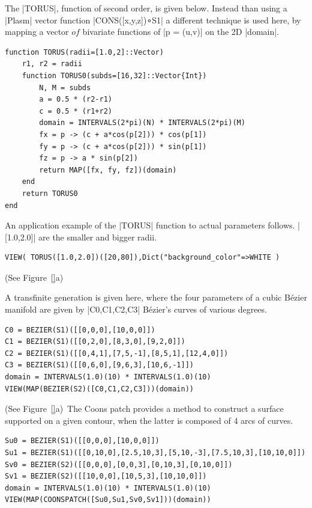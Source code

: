 \begin{coding}[Algebraic computation of FE = $\delta_1$]
\begin{condition}
The |TORUS|, function of second order, is given below.
Instead than using a |Plasm| vector function |CONS([x,y,z])∘S1| a different technique is used here, by mapping a vector $of$ bivariate functions of |p = (u,v)| on the 2D |domain|.
\begin{lstlisting}[language=JuliaLocal, style=julia, mathescape=true]
function TORUS(radii=[1.0,2]::Vector)
	r1, r2 = radii
	function TORUS0(subds=[16,32]::Vector{Int})
		N, M = subds
		a = 0.5 * (r2-r1)
		c = 0.5 * (r1+r2)
		domain = INTERVALS(2*pi)(N) * INTERVALS(2*pi)(M)
		fx = p -> (c + a*cos(p[2])) * cos(p[1])
		fy = p -> (c + a*cos(p[2])) * sin(p[1])
		fz = p -> a * sin(p[2])
		return MAP([fx, fy, fz])(domain)
	end
	return TORUS0
end
\end{lstlisting}
An application example of the |TORUS| function to actual parameters follows. 
|[1.0,2.0]| are the smaller and bigger radii.
\begin{lstlisting}[language=JuliaLocal, style=julia, mathescape=true]
VIEW( TORUS([1.0,2.0])([20,80]),Dict("background_color"=>WHITE ) 
\end{lstlisting}
\end{condition}

\begin{condition} (See Figure~\ref{}a)\ 

A transfinite generation is given here, where the four parameters of a cubic Bézier manifold are given by |C0,C1,C2,C3| Bézier’s curves of various degrees.
\begin{lstlisting}[language=JuliaLocal, style=julia, mathescape=true]
C0 = BEZIER(S1)([[0,0,0],[10,0,0]])
C1 = BEZIER(S1)([[0,2,0],[8,3,0],[9,2,0]])
C2 = BEZIER(S1)([[0,4,1],[7,5,-1],[8,5,1],[12,4,0]])
C3 = BEZIER(S1)([[0,6,0],[9,6,3],[10,6,-1]])
domain = INTERVALS(1.0)(10) * INTERVALS(1.0)(10)
VIEW(MAP(BEZIER(S2)([C0,C1,C2,C3]))(domain))
\end{lstlisting}
\end{condition}


\begin{condition} (See Figure~\ref{}a)\
The Coons patch provides a method to construct a surface supported on a given contour, when the latter is composed of 4 arcs of curves.
\begin{lstlisting}[language=JuliaLocal, style=julia, mathescape=true]
Su0 = BEZIER(S1)([[0,0,0],[10,0,0]])
Su1 = BEZIER(S1)([[0,10,0],[2.5,10,3],[5,10,-3],[7.5,10,3],[10,10,0]])
Sv0 = BEZIER(S2)([[0,0,0],[0,0,3],[0,10,3],[0,10,0]])
Sv1 = BEZIER(S2)([[10,0,0],[10,5,3],[10,10,0]])
domain = INTERVALS(1.0)(10) * INTERVALS(1.0)(10)
VIEW(MAP(COONSPATCH([Su0,Su1,Sv0,Sv1]))(domain))
\end{lstlisting}
\end{condition}


\end{coding}
